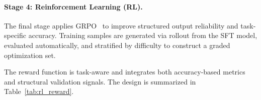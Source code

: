 \paragraph{Stage 4: Reinforcement Learning (RL).}

The final stage applies GRPO~\cite{shao2024deepseekmath} to improve structured output reliability and task-specific accuracy. Training samples are generated via rollout from the SFT model, evaluated automatically, and stratified by difficulty to construct a graded optimization set.

The reward function is task-aware and integrates both accuracy-based metrics and structural validation signals. The design is summarized in Table~\ref{tab:rl_reward}.

\begin{table}[htbp]
\centering
\caption{Reward function design in Stage 4 RL training.}
\label{tab:rl_reward}
\end{table}